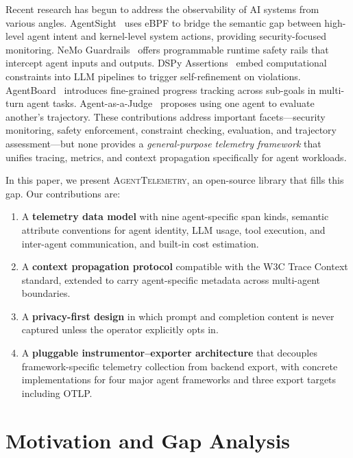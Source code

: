 \documentclass[sigconf,nonacm]{acmart}
\begin{document}
Recent research has begun to address the observability of AI systems from
various angles.  AgentSight~\cite{agentsight} uses eBPF to bridge the
semantic gap between high-level agent intent and kernel-level system
actions, providing security-focused monitoring.  NeMo
Guardrails~\cite{nemo_guardrails} offers programmable runtime safety
rails that intercept agent inputs and outputs.  DSPy
Assertions~\cite{dspy_assertions} embed computational constraints into
LLM pipelines to trigger self-refinement on violations.
AgentBoard~\cite{agentboard} introduces fine-grained progress tracking
across sub-goals in multi-turn agent tasks.  Agent-as-a-Judge~\cite{agent_as_judge}
proposes using one agent to evaluate another's trajectory.
These contributions address important facets---security monitoring, safety
enforcement, constraint checking, evaluation, and trajectory
assessment---but none provides a \emph{general-purpose telemetry framework}
that unifies tracing, metrics, and context propagation specifically for
agent workloads.

In this paper, we present \textsc{AgentTelemetry}, an open-source library
that fills this gap.  Our contributions are:
\begin{enumerate}[leftmargin=*,nosep]
    \item A \textbf{telemetry data model} with nine agent-specific span
        kinds, semantic attribute conventions for agent identity, LLM
        usage, tool execution, and inter-agent communication, and
        built-in cost estimation.
    \item A \textbf{context propagation protocol} compatible with the W3C
        Trace Context standard, extended to carry agent-specific metadata
        across multi-agent boundaries.
    \item A \textbf{privacy-first design} in which prompt and completion
        content is never captured unless the operator explicitly opts in.
    \item A \textbf{pluggable instrumentor--exporter architecture} that
        decouples framework-specific telemetry collection from backend
        export, with concrete implementations for four major agent
        frameworks and three export targets including OTLP.
\end{enumerate}

\section{Motivation and Gap Analysis}
\label{sec:motivation}
\end{document}

